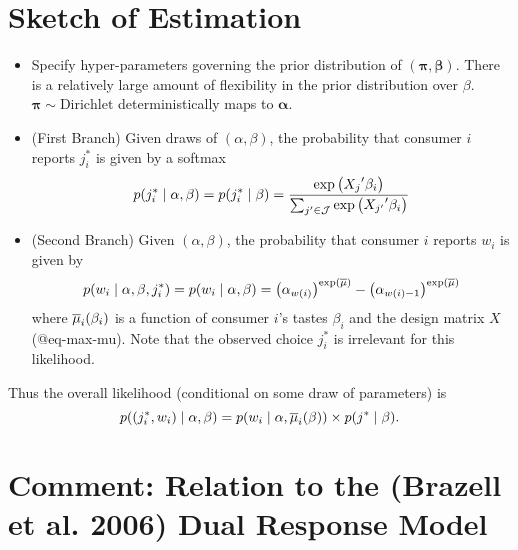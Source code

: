 \documentclass[
]{article}
\begin{document}
\section{Sketch of Estimation}\label{sketch-of-estimation}

\begin{itemize}
    \item Specify hyper-parameters governing the prior distribution of $\left(\symbf{\pi}, \symbf{\beta}\right)$. There is a relatively large amount of flexibility in the prior distribution over $\beta$. $\symbf{\pi} \sim \text{Dirichlet}$ deterministically maps to $\symbf{\alpha}$.
    \item (First Branch) Given draws of $\left(\alpha, \beta\right)$, the probability that consumer $i$ reports $j^*_i$ is given by a softmax
    \begin{equation}
        p\mleft(j^*_i \mid \alpha, \beta\mright) = p\mleft(j^*_i \mid \beta\mright) = \frac{\exp\left({X_j}'\beta_i\right)}{\sum_{j'\in\mathcal{J}}\exp\left({X_{j'}}'\beta_i\right)}
    \end{equation}
    \item (Second Branch) Given $\left(\alpha, \beta\right)$, the probability that consumer $i$ reports $w_i$ is given by
    \begin{equation}
        p\mleft(w_i \mid \alpha,\beta, j^*_i\mright) = p\mleft(w_i\mid \alpha, \beta\mright) =  \left({\alpha_{w\mleft(i\mright)}}\right)^{\exp\left(\overline{\mu}\right)} - \left({\alpha_{w\mleft(i\mright)-1}}\right)^{\exp\left(\overline{\mu}\right)}
    \end{equation}
    where $\overline{\mu}_i\mleft(\beta_i\mright)$ is a function of consumer $i$'s tastes $\beta_i$ and the design matrix $X$ (@eq-max-mu). Note that the observed choice $j^*_i$ is irrelevant for this likelihood.
\end{itemize}

Thus the overall likelihood (conditional on some draw of parameters) is
\begin{equation}
    p\mleft(\left(j^*_i, w_i\right) \mid \alpha, \beta \mright) = p\mleft(w_i \mid \alpha,\overline{\mu}_i\mleft(\beta\mright) \mright) \times p\mleft(j^* \mid \beta\mright).
\end{equation}

\section{Comment: Relation to the (Brazell et al. 2006) Dual Response
Model}\label{comment-relation-to-the-brazell_2006-dual-response-model}
\end{document}
